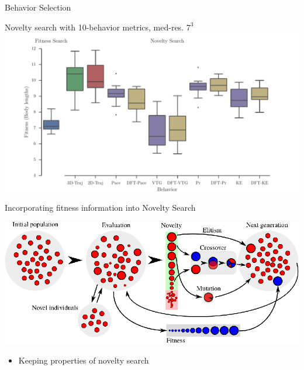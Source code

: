\documentclass[6pt]{beamer}
\begin{document}
{\begin{frame}{Behavior Selection}
\begin{block}{Novelty search with 10-behavior metrics, med-res. $7^3$}
\centering
\includegraphics[width=1.0\textwidth]{../Figures/Results/BehaviorsPerformance.pdf}
\end{block}
\end{frame}


\begin{frame}{Incorporating fitness information into Novelty Search}
\begin{center}
\includegraphics[width=\textwidth]{../Figures/Misc/EvolutionNoveltyFitnessElitism.eps}
\end{center}
\begin{itemize}
\item Keeping properties of novelty search
\end{itemize}
\end{frame}

}
\end{document}
